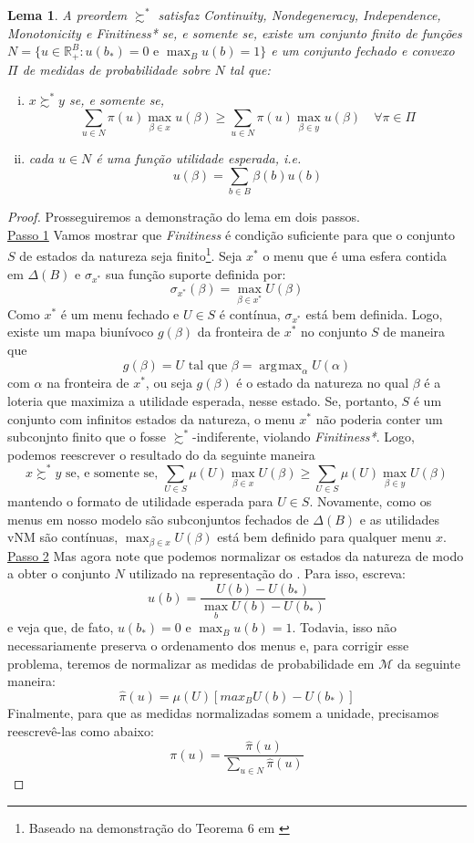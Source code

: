 \documentclass[11pt, a4paper]{article}
\theoremstyle{nonumberplain}
\newtheorem{proof}{Dem.}
\theoremstyle{plain}
\theoremstyle{plain}
\theoremstyle{plain}
\newtheorem{lemma}{Lema}
\DeclareMathOperator*{\argmax}{\arg\!\max}
\begin{document}
\begin{lemma}\label{nossoKochov} A preordem $\succsim^*$ satisfaz \emph{Continuity}, \emph{Nondegeneracy}, \emph{Independence}, \emph{Monotonicity} e \emph{Finitiness*} se, e somente se, existe um conjunto finito de funções $N=\{u \in \mathbb{R}^B_+:u(b_*)=0\text { e }\max_{B}u(b)=1\}$ e um conjunto fechado e convexo $\Pi$ de medidas de probabilidade sobre $N$ tal que:
\begin{enumerate}[(i)]
\item $x\succsim^* y$ se, e somente se, $$ \sum_{u\in N} \pi(u)\max_{\beta\in x}u(\beta) \geq \sum_{u\in N} \pi(u)\max_{\beta\in y}u(\beta)\quad \forall\pi\in\Pi$$  
\item cada $u \in N$ é uma função utilidade esperada, i.e. $$u(\beta)=\sum_{b\in B} \beta(b)u(b)$$ 
\end{enumerate}     
\end{lemma}
\begin{proof}
Prosseguiremos a demonstração do lema em dois passos.\\
\underline{Passo 1} Vamos mostrar que \emph{Finitiness} é condição suficiente para que o conjunto $S$ de estados da natureza seja finito\footnote{Baseado na demonstração do Teorema 6 em \cite{Dekel2009}}. Seja $x^*$ o menu que é uma esfera contida em $\Delta(B)$ e $\sigma_{x^*}$ sua função suporte definida por: $$\sigma_{x^*}(\beta)=\max_{\beta\in x^*} U(\beta) $$ Como $x^*$ é um menu fechado e $U\in S$ é contínua, $\sigma_{x^*}$ está bem definida. Logo, existe um mapa biunívoco $g(\beta)$ da fronteira de $x^*$ no conjunto $S$ de maneira que $$g(\beta)=U\text{ tal que } \beta=\argmax_{\alpha}U(\alpha)$$ com $\alpha$ na fronteira de $x^*$, ou seja $g(\beta)$ é o estado da natureza no qual $\beta$ é a loteria que maximiza a utilidade esperada, nesse estado. Se, portanto, $S$ é um conjunto com infinitos estados da natureza, o menu $x^*$ não poderia conter um subconjnto finito que o fosse $\succsim^*$-indiferente, violando \emph{Finitiness*}. Logo, podemos reescrever o resultado do  da seguinte maneira $$x\succsim^* y \text{ se, e somente se, } \sum_{U\in S} \mu(U)\max_{\beta\in x}U(\beta) \geq \sum_{U\in S} \mu(U)\max_{\beta\in y}U(\beta)$$ 
mantendo o formato de utilidade esperada para $U\in S$. Novamente, como os menus em nosso modelo são subconjuntos fechados de $\Delta(B)$ e as utilidades vNM são contínuas, $\max_{\beta\in x}U(\beta)$ está bem definido para qualquer menu $x$.\\

\noindent
\underline{Passo 2} Mas agora note que podemos normalizar os estados da natureza de modo a obter o conjunto $N$ utilizado na representação do . Para isso, escreva:
$$u(b)=\frac{U(b)-U(b_*)}{\max_b U(b)-U(b_*)}$$  
e veja que, de fato, $u(b_*)=0$ e $\max_{B} u(b)=1$. Todavia, isso não necessariamente preserva o ordenamento dos menus e, para corrigir esse problema, teremos de normalizar as medidas de probabilidade em $\mathcal{M}$ da seguinte maneira:
$$ \hat{\pi}(u)=\mu(U)\left[max_B U(b)-U(b_*)\right]$$ Finalmente, para que as medidas normalizadas somem a unidade, precisamos reescrevê-las como abaixo:  \[\pi(u)=\frac{\hat{\pi}(u)}{\sum_{u\in N}\hat{\pi}(u)}\]
\end{proof}
\end{document}
